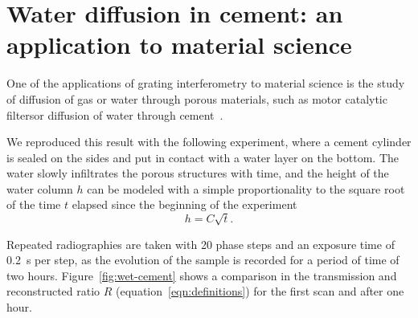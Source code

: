 \section{Water diffusion in cement: an application to material science}
One of the applications of grating interferometry to material science is the
study of diffusion of gas or water through porous materials, such as motor
catalytic filters\cn or diffusion of water through cement~\parencite{20.500.11850/268}.

We reproduced this result with the following experiment, where a cement
cylinder is sealed on the sides and put in contact with a water layer on the
bottom. The water slowly infiltrates the porous structures with time, and
the height of the water column $h$ can be modeled with a simple
proportionality to the square root of the time $t$ elapsed since the beginning
of the experiment
\begin{equation}
    h = C\sqrt{t}.
    \label{eq:sorptivity}
\end{equation}

Repeated radiographies are taken with \num{20} phase steps and an exposure
time of \SI{0.2}{\second} per step, as the evolution of the sample is
recorded for a period of time of two hours. Figure~\ref{fig:wet-cement}
shows a comparison in the transmission and reconstructed ratio $R$
(equation~\ref{eqn:definitions}) for the first scan and after one hour.

